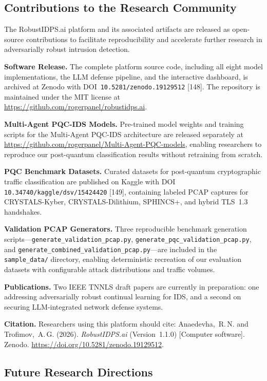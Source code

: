 \subsection{Contributions to the Research Community}
\label{subsec:contributions}

The RobustIDPS.ai platform and its associated artifacts are released as
open-source contributions to facilitate reproducibility and accelerate
further research in adversarially robust intrusion detection.

\textbf{Software Release.} The complete platform source code, including all
eight model implementations, the LLM defense pipeline, and the interactive
dashboard, is archived at Zenodo with DOI~\texttt{10.5281/zenodo.19129512}
[148]. The repository is maintained under the MIT license at
\url{https://github.com/rogerpanel/robustidps.ai}.

\textbf{Multi-Agent PQC-IDS Models.} Pre-trained model weights and training
scripts for the Multi-Agent PQC-IDS architecture are released separately at
\url{https://github.com/rogerpanel/Multi-Agent-PQC-models}, enabling
researchers to reproduce our post-quantum classification results without
retraining from scratch.

\textbf{PQC Benchmark Datasets.} Curated datasets for post-quantum
cryptographic traffic classification are published on Kaggle with DOI
\texttt{10.34740/kaggle/dsv/15424420} [149], containing labeled PCAP
captures for CRYSTALS-Kyber, CRYSTALS-Dilithium, SPHINCS+, and hybrid
TLS~1.3 handshakes.

\textbf{Validation PCAP Generators.} Three reproducible benchmark generation
scripts---\texttt{generate\_validation\_pcap.py},
\texttt{generate\_pqc\_validation\_pcap.py}, and
\texttt{generate\_combined\_validation\_pcap.py}---are included in the
\texttt{sample\_data/} directory, enabling deterministic recreation of our
evaluation datasets with configurable attack distributions and traffic
volumes.

\textbf{Publications.} Two IEEE TNNLS draft papers are currently in
preparation: one addressing adversarially robust continual learning for IDS,
and a second on securing LLM-integrated network defense systems.

\textbf{Citation.} Researchers using this platform should cite:
Anaedevha,~R.\,N. and Trofimov,~A.\,G. (2026). \textit{RobustIDPS.ai}
(Version~1.1.0) [Computer software]. Zenodo.
\url{https://doi.org/10.5281/zenodo.19129512}.

\subsection{Future Research Directions}
\label{subsec:future-directions}


